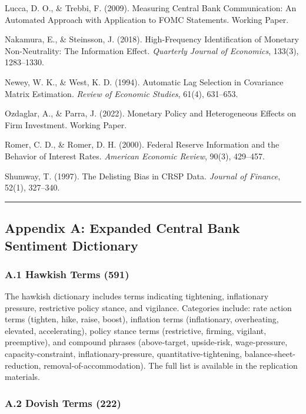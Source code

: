\documentclass[12pt]{article}
\begin{document}
Lucca, D. O., \& Trebbi, F. (2009). Measuring Central Bank
Communication: An Automated Approach with Application to FOMC
Statements. Working Paper.

Nakamura, E., \& Steinsson, J. (2018). High-Frequency Identification of
Monetary Non-Neutrality: The Information Effect. \emph{Quarterly Journal
of Economics}, 133(3), 1283--1330.

Newey, W. K., \& West, K. D. (1994). Automatic Lag Selection in
Covariance Matrix Estimation. \emph{Review of Economic Studies}, 61(4),
631--653.

Ozdaglar, A., \& Parra, J. (2022). Monetary Policy and Heterogeneous
Effects on Firm Investment. Working Paper.

Romer, C. D., \& Romer, D. H. (2000). Federal Reserve Information and
the Behavior of Interest Rates. \emph{American Economic Review}, 90(3),
429--457.

Shumway, T. (1997). The Delisting Bias in CRSP Data. \emph{Journal of
Finance}, 52(1), 327--340.

\begin{center}\rule{0.5\linewidth}{0.5pt}\end{center}

\subsection{Appendix A: Expanded Central Bank Sentiment
Dictionary}\label{appendix-a-expanded-central-bank-sentiment-dictionary}

\subsubsection{A.1 Hawkish Terms (591)}\label{a.1-hawkish-terms-591}

The hawkish dictionary includes terms indicating tightening,
inflationary pressure, restrictive policy stance, and vigilance.
Categories include: rate action terms (tighten, hike, raise, boost),
inflation terms (inflationary, overheating, elevated, accelerating),
policy stance terms (restrictive, firming, vigilant, preemptive), and
compound phrases (above-target, upside-risk, wage-pressure,
capacity-constraint, inflationary-pressure, quantitative-tightening,
balance-sheet-reduction, removal-of-accommodation). The full list is
available in the replication materials.

\subsubsection{A.2 Dovish Terms (222)}\label{a.2-dovish-terms-222}
\end{document}
